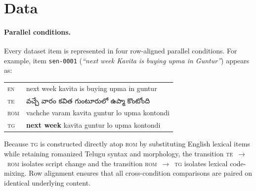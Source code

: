 \documentclass[11pt]{article}
\newcommand{\telugufont}{}
\newcommand{\tel}[1]{{\telugufont #1}}
\newcommand{\cond}[1]{\textsc{#1}}
\begin{document}
\section{Data}

\paragraph{Parallel conditions.}
Every dataset item is represented in four row-aligned parallel conditions. For
example, item \texttt{sen-0001} (\emph{``next week Kavita is buying upma in
Guntur''}) appears as:

\begin{center}
\small
\begin{tabular}{@{}lp{58mm}@{}}
\toprule
\cond{en} & next week kavita is buying upma in guntur \\
\cond{te} & \tel{వచ్చే వారం కవిత గుంటూరులో ఉప్మా కొంటోంది} \\
\cond{rom} & vachche varam kavita guntur lo upma kontondi \\
\cond{tg} & \textbf{next week} kavita guntur lo upma kontondi \\
\bottomrule
\end{tabular}
\end{center}

Because \cond{tg} is constructed directly atop \cond{rom} by substituting
English lexical items while retaining romanized Telugu syntax and morphology,
the transition \cond{te}~$\to$~\cond{rom} isolates script change and the
transition \cond{rom}~$\to$~\cond{tg} isolates lexical code-mixing. Row
alignment ensures that all cross-condition comparisons are paired on identical
underlying content.
\end{document}
